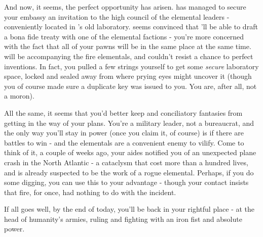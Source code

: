 \documentclass[char]{elementals}
\begin{document}
And now, it seems, the perfect opportunity has arisen. \cLeader{} has managed to secure your embassy an invitation to the high council of the elemental leaders - conveniently located in \cGrandfather{}’s old laboratory. \cLeader{} seems convinced that \cLeader{\they}’ll be able to draft a bona fide treaty with one of the elemental factions - you’re more concerned with the fact that all of your pawns will be in the same place at the same time. \cPyro{} will be accompanying the fire elementals, and \cMS{} couldn’t resist a chance to perfect \cMS{\their} inventions. In fact, you pulled a few strings yourself to get \cMS{\them} some \emph{secure} laboratory space, locked and sealed away from where prying eyes might uncover it (though you of course made sure a duplicate key was issued to you. You are, after all, not a moron). 

All the same, it seems that you’d better keep \cLeader{} and \cLeader{\their} conciliatory fantasies from getting in the way of your plans. You’re a military leader, not a bureaucrat, and the only way you’ll stay in power (once you claim it, of course) is if there are battles to win - and the elementals are a convenient enemy to vilify. Come to think of it, a couple of weeks ago, your aides notified you of an unexpected plane crash in the North Atlantic - a cataclysm that cost more than a hundred lives, and is already suspected to be the work of a rogue elemental. Perhaps, if you do some digging, you can use this to your advantage - though your contact \cPyro{} insists that fire, for once, had nothing to do with the incident.

If all goes well, by the end of today, you’ll be back in your rightful place - at the head of humanity’s armies, ruling and fighting with an iron fist and absolute power. 

\end{document}
